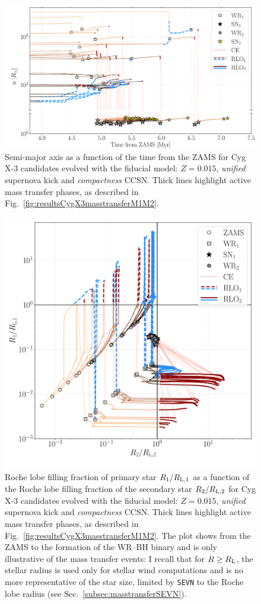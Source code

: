 \documentclass[a4paper,titlepage]{book}     	%
\begin{document}
\begin{figure}[t!]
	\centering
	\includegraphics[width=\textwidth]{./images/BWorldtime_Semimajor_BHBH_GW_WRBH_cyg_x-3--Ko17.pdf}
	\caption{Semi-major axis as a function of the time from the ZAMS for Cyg X-3 candidates evolved with the fiducial model: $Z=0.015$, \emph{unified} supernova kick and \emph{compactness} CCSN. Thick lines highlight active mass transfer phases, as described in Fig.\ \ref{fig:resultsCygX3masstransferM1M2}.}\label{fig:resultsCygX3masstransferSemimajor}
\end{figure}

\begin{figure}[b!]
		\centering
		\includegraphics[width=.7\textwidth]{./images/RLfill1_RLfill0_BHBH_GW_WRBH_cyg_x-3--Ko17.pdf}	
    \caption{Roche lobe filling fraction of primary star $R_1/R_{\rm L,1}$ as a function of the Roche lobe filling fraction of the secondary star $R_2/R_{\rm L,2}$ for Cyg X-3 candidates evolved with the fiducial model: $Z=0.015$, \emph{unified} supernova kick and \emph{compactness} CCSN. Thick lines highlight active mass transfer phases, as described in Fig.\ \ref{fig:resultsCygX3masstransferM1M2}. The plot shows from the ZAMS to the formation of the WR--BH binary and is only illustrative of the mass transfer events: I recall that for $R \geq R_{\rm L}$, the stellar radius is used only for stellar wind computations and is no more representative of the star size, limited by \texttt{SEVN} to the Roche lobe radius (see Sec.\ \ref{subsec:masstransferSEVN}).}\label{fig:resultsCygX3masstransferRLfill}
\end{figure}
\end{document}
